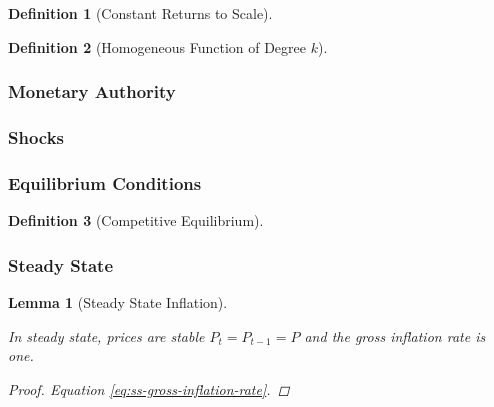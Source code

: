 \documentclass[
	12pt,
	]{article}
\numberwithin{equation}{section}
\theoremstyle{definition}
\newtheorem{definition}{Definition}[section]
\theoremstyle{plain}
\theoremstyle{plain}
\newtheorem{lemma}{Lemma}[section]
\theoremstyle{plain}
\begin{document}

\begin{definition}[Constant Returns to Scale]
	\cite[Lecture 1, p.5]{solis-garcia_ucb_2022}
\end{definition}

\begin{definition}[Homogeneous Function of Degree $k$]
	\cite[Lecture 1, p.5]{solis-garcia_ucb_2022}
\end{definition}

\subsubsection{Monetary Authority}

\subsubsection{Shocks}

\subsubsection{Equilibrium Conditions}

\begin{definition}[Competitive Equilibrium]
	\cite[Lecture 1, p.6]{solis-garcia_ucb_2022}
\end{definition}


\subsubsection{Steady State}


\begin{lemma}[Steady State Inflation]\label{lemma:steady-state-inflation}
	
	In steady state, prices are stable $P_t = P_{t-1} = P$ and the gross inflation rate is one.
	\begin{proof} Equation \ref{eq:ss-gross-inflation-rate}. \end{proof}  \end{lemma}
\end{document}
